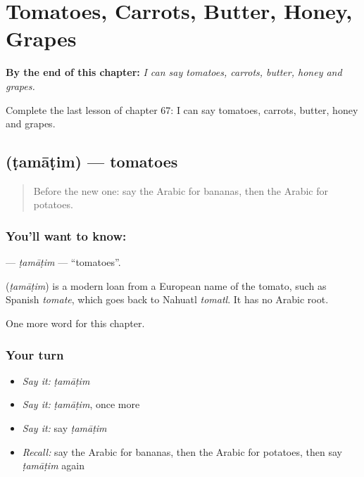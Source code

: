 
\chapter{Tomatoes, Carrots, Butter, Honey, Grapes}
\label{ch:ar-tomatoes-carrots-butter-honey-grapes}

\begin{chapteropening}
\textbf{By the end of this chapter:} \emph{I can say tomatoes, carrots, butter, honey and grapes.}

Complete the last lesson of chapter 67: I can say tomatoes, carrots, butter, honey and grapes.
\end{chapteropening}

\section[\texorpdfstring{\ar{طماطم} (ṭamāṭim)}{طماطم (ṭamāṭim)}]{ (ṭamāṭim) — tomatoes}

\label{lesson:AR-C67-tamatim}



\begin{quote}
Before the new one: say the Arabic for bananas, then the Arabic for potatoes.
\end{quote}

\subsection*{You'll want to know: }
\textbf{} — \emph{ṭamāṭim} — \textquotedblleft{}tomatoes\textquotedblright{}.

\begin{cousinweb}
\textbf{} (\emph{ṭamāṭim}) is a modern loan from a European name of the tomato, such as Spanish \emph{tomate}, which goes back to Nahuatl \emph{tomatl}. It has no Arabic root.
\end{cousinweb}

\begin{grammarlens}[title={What you've built}]
One more word for this chapter.
\end{grammarlens}

\subsection*{Your turn}
\begin{itemize}
\raggedright
  \item \emph{Say it:} \emph{ṭamāṭim}
  \item \emph{Say it:} \emph{ṭamāṭim}, once more
  \item \emph{Say it:} say \emph{ṭamāṭim}
  \item \emph{Recall:} say the Arabic for bananas, then the Arabic for potatoes, then say \emph{ṭamāṭim} again
\end{itemize}

